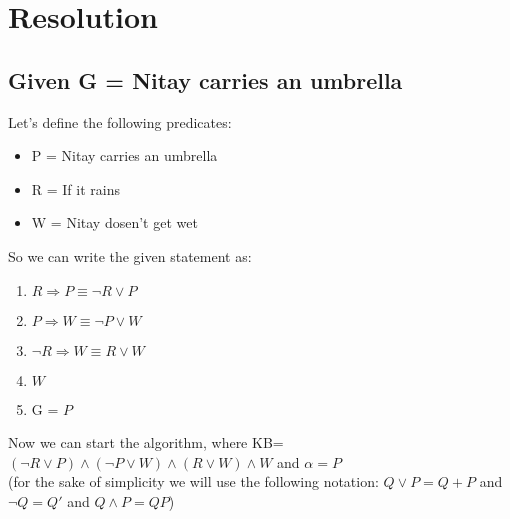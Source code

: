 \documentclass{article}
\begin{document}
\section{Resolution}

\subsection{Given G = Nitay carries an umbrella}
Let's define the following predicates:
\begin{itemize}
    \item P = Nitay carries an umbrella
    \item R = If it rains
    \item W = Nitay dosen't get wet
\end{itemize}
So we can write the given statement as:
\begin{enumerate}
    \item $R \Rightarrow P \equiv \neg R \lor P$ 
    \item $P \Rightarrow W \equiv \neg P \lor W$
    \item $\neg R \Rightarrow W \equiv R \lor W$
    \item $ W$
    \item G = $P$
\end{enumerate}
Now we can start the algorithm, where KB=$(\neg R \lor P) \land (\neg P \lor W) \land (R \lor W) \land W$ and $\alpha =  P$\\
(for the sake of simplicity we will use the following notation: $Q \lor P = Q+P$ and $\neg Q = Q' $ and $Q \land P = QP$)
\end{document}
